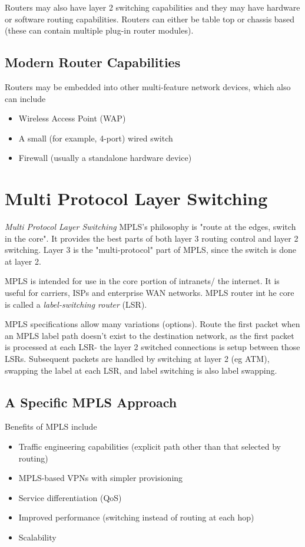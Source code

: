 Routers may also have layer 2 switching capabilities and they may have hardware or software routing capabilities. Routers can either be table top or chassis based (these can contain multiple plug-in router modules). 
\subsection*{Modern Router Capabilities}
Routers may be embedded into other multi-feature network devices, which also can include
\begin{itemize}
    \item Wireless Access Point (WAP)
    \item A small (for example, 4-port) wired switch
    \item Firewall (usually a standalone hardware device)
\end{itemize}

\section*{Multi Protocol Layer Switching}
\textit{Multi Protocol Layer Switching} MPLS's philosophy is "route at the edges, switch in the core". It provides the best parts of both layer 3 routing control and layer 2 switching. Layer 3 is the "multi-protocol" part of MPLS, since the switch is done at layer 2.

MPLS is intended for use in the core portion of intranets/ the internet. It is useful for carriers, ISPs and enterprise WAN networks. MPLS router int he core is called a \textit{label-switching router} (LSR).

MPLS specifications allow many variations (options). Route the first packet when an MPLS label path doesn't exist to the destination network, as the first packet is processed at each LSR- the layer 2 switched connections is setup between those LSRs. Subsequent packets are handled by switching at layer 2 (eg ATM), swapping the label at each LSR, and label switching is also label swapping. 

\subsection*{A Specific MPLS Approach}
Benefits of MPLS include
\begin{itemize}
    \item Traffic engineering capabilities (explicit path other than that selected by routing)
    \item MPLS-based VPNs with simpler provisioning
    \item Service differentiation (QoS)
    \item Improved performance (switching instead of routing at each hop)
    \item Scalability
\end{itemize}

